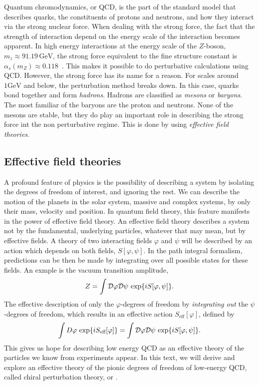 Quantum chromodynamics, or QCD, is the part of the standard model that describes quarks, the constituents of protons and neutrons, and how they interact via the strong nuclear force.
When dealing with the strong force, the fact that the strength of interaction depend on the energy scale of the interaction becomes apparent.
In high energy interactions at the energy scale of the $Z$-boson, $m_z \approx 91.19 \, \text{GeV}$, the strong force equivalent to the fine structure constant is $\alpha_s(m_Z) \approx 0.118$~\cite{PDG}. 
This makes it possible to do perturbative calculations using QCD.
However, the strong force has its name for a reason.
For scales around $1 \text{GeV}$ and below, the perturbation method breaks down.
In this case, quarks bond together and form \emph{hadrons}.
Hadrons are classified as \emph{mesons} or \emph{baryons}.
The most familiar of the baryons are the proton and neutrons.
None of the mesons are stable, but they do play an important role in describing the strong force int the non perturbative regime.
This is done by using \emph{effective field theories}.

\subsection*{Effective field theories}

A profound feature of physics is the possibility of describing a system by isolating the degrees of freedom of interest, and ignoring the rest.
We can describe the motion of the planets in the solar system, massive and complex systems, by only their mass, velocity and position.
In quantum field theory, this feature manifests in the power of effective field theory.
An effective field theory describes a system not by the fundamental, underlying particles, whatever that may mean, but by effective fields.
A theory of two interacting fields $\varphi$ and $\psi$ will be described by an action which depends on both fields, $S[\varphi, \psi]$.
In the path integral formalism, predictions can be then be made by integrating over all possible states for these fields.
An exmple is the vacuum transition amplitude,
\begin{equation}
    Z = \int \mathcal{D} \varphi \mathcal{D} \psi \, \exp{i S[\varphi, \psi]}.
\end{equation}
The effective description of only the $\varphi$-degrees of freedom by \emph{integrating out} the $\psi$-degrees of freedom, which results in an effective action $S_\text{eff}[\varphi]$, defined by~\cite{Schwartz:QFT}
\begin{equation}
    \label{integrating out degrees of freedom}
    \int D \varphi \, \exp{i S_\text{eff}[\varphi]} 
    =
    \int \mathcal{D} \varphi \mathcal{D} \psi \, \exp{i S[\varphi, \psi]}.
\end{equation}
This gives us hope for describing low energy QCD as an effective theory of the particles we know from experiments appear.
In this text, we will derive and explore an effective theory of the pionic degrees of freedom of low-energy QCD, called chiral perturbation theory, or \chpt.

